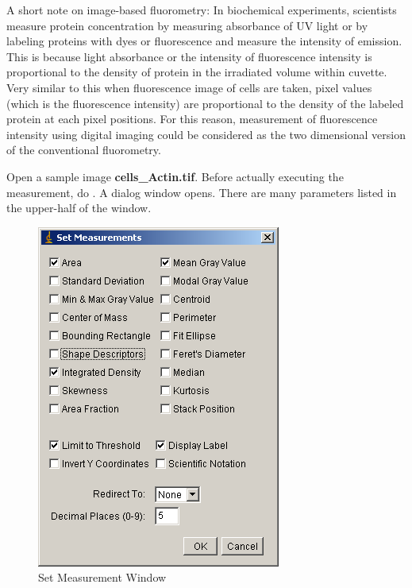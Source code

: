 A short note on image-based fluorometry: In biochemical experiments,
scientists measure protein concentration by measuring absorbance of UV
light or by labeling proteins with dyes or fluorescence and measure the
intensity of emission. This is because light absorbance or the
intensity of fluorescence intensity is proportional to the density of
protein in the irradiated volume within cuvette. Very similar to this
when fluorescence image of cells are taken, pixel values (which is the
fluorescence intensity) are proportional to the density of the labeled
protein at each pixel positions. For this reason, measurement of
fluorescence intensity using digital imaging could be considered as the
two dimensional version of the conventional fluorometry. 

\begin{indentexercise}{1}
\item Open a sample image \textbf{cells\_Actin.tif}. Before actually executing the measurement,
do . A dialog
window opens. There are many parameters listed in the upper-half of the
window.

\begin{figure}[htbp]
\begin{center}
\includegraphics[width=8.017cm,height=11.298cm]{fig/CMCIBasicCourse201102-img32.png}
\caption{Set Measurement Window}
\label{fig:img32}
\end{center}
\end{figure}



\end{indentexercise}
